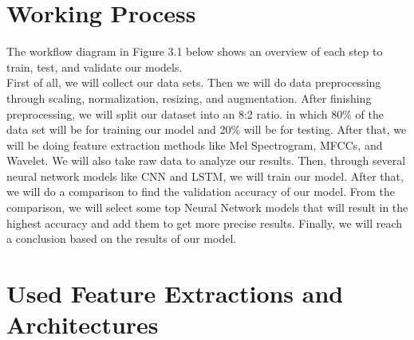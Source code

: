 \section{Working Process }
The workflow diagram in Figure 3.1 below shows an overview of each step to train, test, and validate our models.\\
 
First of all, we will collect our data sets. Then we will do data preprocessing through scaling, normalization, resizing, and augmentation. After finishing preprocessing, we will split our dataset into an 8:2 ratio. in which 80\% of the data set will be for training our model and 20\% will be for testing. After that, we will be doing feature extraction methods like Mel Spectrogram, MFCCs, and Wavelet. We will also take raw data to analyze our results. Then, through several neural network models like CNN and LSTM, we will train our model. After that, we will do a comparison to find the validation accuracy of our model. From the comparison, we will select some top Neural Network models that will result in the highest accuracy and add them to get more precise results. Finally, we will reach a conclusion based on the results of our model. 
\section{Used Feature Extractions and Architectures  }
